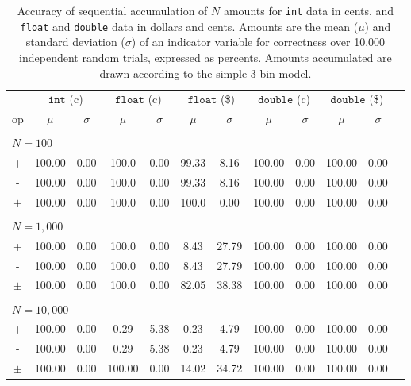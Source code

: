 \documentclass[11pt, oneside]{amsart}   	%
\begin{document}
\begin{table}[ht]
\begin{center}
\caption{Accuracy of sequential accumulation of $N$ amounts for \texttt{int} data in cents, and \texttt{float} and \texttt{double} data in dollars and cents. Amounts are the mean ($\mu$) and standard deviation ($\sigma$) of an indicator variable for correctness over 10,000 independent random trials, expressed as percents. Amounts accumulated are drawn according to the simple 3 bin model.}
\label{TBL:draft-3bin}
\begin{tabular}{ c c c c c c c c c c c c } 
& \multicolumn{2}{c}{$\texttt{int}$ (c)}
& \multicolumn{2}{c}{$\texttt{float}$ (c)}
& \multicolumn{2}{c}{$\texttt{float}$ (\$)}
& \multicolumn{2}{c}{$\texttt{double}$ (c)}
& \multicolumn{2}{c}{$\texttt{double}$ (\$)} \\
op & $\mu$ & $\sigma$ & $\mu$ & $\sigma$ & $\mu$ & $\sigma$ & $\mu$ & $\sigma$ & $\mu$ & $\sigma$ \\ \hline
\\ \multicolumn{11}{l}{$N = 100$} \\ \hline
+ 		& 100.00 & 0.00 	& 100.0 & 0.00 		& 99.33 & 8.16 & 100.00 & 0.00 & 100.00 & 0.00 \\
- 		& 100.00 & 0.00 	& 100.0 & 0.00 		& 99.33 & 8.16 & 100.00 & 0.00 & 100.00 & 0.00 \\
$\pm$ 	& 100.00 & 0.00 	& 100.0 & 0.00 		& 100.0 & 0.00 & 100.00 & 0.00 & 100.00 & 0.00 \\
\\ \multicolumn{11}{l}{$N = 1,000$} \\ \hline
+ 		& 100.00 & 0.00 	& 100.0 & 0.00 		& 8.43 & 27.79 & 100.00 & 0.00 & 100.00 & 0.00 \\
- 		& 100.00 & 0.00 	& 100.0 & 0.00 		& 8.43 & 27.79 & 100.00 & 0.00 & 100.00 & 0.00 \\
$\pm$ 	& 100.00 & 0.00 	& 100.0 & 0.00 		& 82.05 & 38.38 & 100.00 & 0.00 & 100.00 & 0.00 \\
\\ \multicolumn{11}{l}{$N = 10,000$} \\ \hline
+ 		& 100.00 & 0.00 	& 0.29 & 5.38 		& 0.23 & 4.79 & 100.00 & 0.00 & 100.00 & 0.00 \\
- 		& 100.00 & 0.00 	& 0.29 & 5.38 		& 0.23 & 4.79 & 100.00 & 0.00 & 100.00 & 0.00 \\
$\pm$ 	& 100.00 & 0.00 	& 100.00 & 0.00 	& 14.02 & 34.72 & 100.00 & 0.00 & 100.00 & 0.00 \\

\end{tabular}
\end{center}
\end{table}
\end{document}
